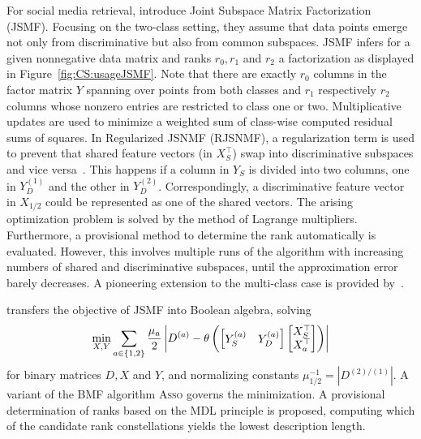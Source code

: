 For social media retrieval, \cite{gupta2010nonnegative} introduce Joint Subspace Matrix Factorization (JSMF). Focusing on the two-class setting, they assume that data points emerge not only from discriminative but also from common subspaces. JSMF infers for a given nonnegative data matrix and ranks $r_0,r_1$ and $r_2$ a factorization as displayed in Figure~\ref{fig:CS:usageJSMF}. Note that there are exactly $r_0$ columns in the factor matrix $Y$ spanning over points from both classes and $r_1$ respectively $r_2$ columns whose nonzero entries are restricted to class one or two. Multiplicative updates are used to minimize a weighted sum of class-wise computed residual sums of squares.
In Regularized JSNMF (RJSNMF), a regularization term is used to prevent that shared feature vectors (in $X_S^\top $) swap into discriminative subspaces and vice versa~\citep{gupta2013regularized}. This happens if a column in $Y_S$ is divided into two columns, one in $Y_D^{(1)}$ and the other in $Y_D^{(2)}$. Correspondingly, a discriminative feature vector in $X_{1/2}$ could be represented as one of the shared vectors. The arising optimization problem is solved by the method of Lagrange multipliers. Furthermore, a provisional method to determine the rank automatically is evaluated. However, this involves multiple runs of the algorithm with increasing numbers of shared and discriminative subspaces, until the approximation error barely decreases.
A pioneering extension to the multi-class case  is provided by~\cite{gupta2014matrix}.

\cite{miettienen2012finding} transfers the objective of JSMF into Boolean algebra, solving
\[\min_{X,Y}\sum_{a\in\{1,2\}}\frac{\mu_a}{2}\left|D^{(a)}-\theta\left(\begin{bmatrix}
Y^{(a)}_{S} & Y^{(a)}_D
\end{bmatrix} \begin{bmatrix}
	X_S^\top \\
    X_a^\top 
\end{bmatrix}\right)\right|\]
for binary matrices $D, X$ and $Y$, and normalizing constants $\mu_{1/2}^{-1} =|D^{(2)/(1)}|$.  A variant of the BMF algorithm \textsc{Asso} governs the minimization. A provisional determination of ranks based on the MDL principle is proposed, computing which of the candidate rank constellations yields the lowest description length.

